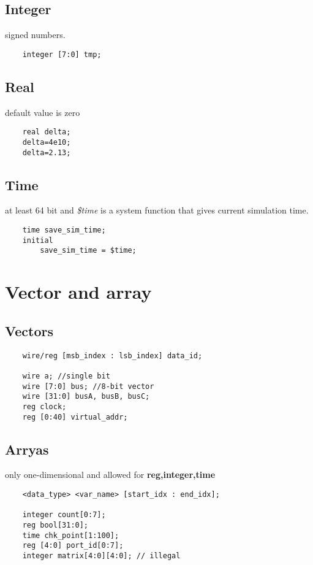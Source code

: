 \subsection{Integer}
signed numbers.
\begin{lstlisting}
    integer [7:0] tmp;
\end{lstlisting}

\subsection{Real}
default value is zero
\begin{lstlisting}
    real delta;
    delta=4e10;
    delta=2.13;
\end{lstlisting}

\subsection{Time}
at least 64 bit and \textit{\$time} is a system function that gives current simulation time.
\begin{lstlisting}
    time save_sim_time;
    initial 
        save_sim_time = $time;
\end{lstlisting}

\section{Vector and array}
\subsection{Vectors}
\begin{lstlisting}
    wire/reg [msb_index : lsb_index] data_id;

    wire a; //single bit 
    wire [7:0] bus; //8-bit vector
    wire [31:0] busA, busB, busC;
    reg clock;
    reg [0:40] virtual_addr;
\end{lstlisting}

\subsection{Arryas}
only one-dimensional and allowed for \textbf{reg,integer,time}
\begin{lstlisting}
    <data_type> <var_name> [start_idx : end_idx];

    integer count[0:7];
    reg bool[31:0];
    time chk_point[1:100];
    reg [4:0] port_id[0:7];
    integer matrix[4:0][4:0]; // illegal
\end{lstlisting}

